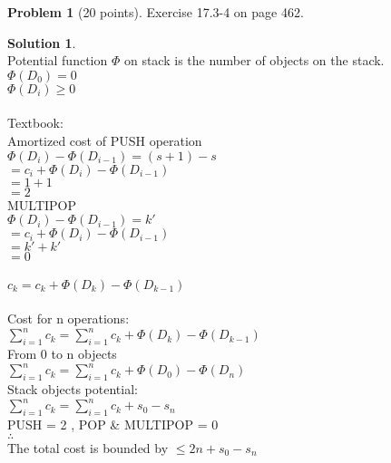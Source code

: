 \documentclass{article}
\theoremstyle{definition}
\newtheorem{problem}{Problem}
\newtheorem*{solution}{Solution}
\begin{document}
\newpage

\begin{problem}[20 points]
Exercise 17.3-4 on page 462.
\end{problem}
\begin{solution} \\
Potential function $\Phi$ on stack is the number of objects on the stack.\\
$\Phi(D_0) = 0$\\
$\Phi(D_i) \geq 0$\\
\\
Textbook:\\
Amortized cost of PUSH operation\\
$\Phi(D_i) - \Phi(D_{i-1}) = ( s + 1 ) - s$ \\
$=c_i + \Phi(D_i) - \Phi(D_{i-1}) $\\
$=1+1$\\
$=2$\\
MULTIPOP\\
$\Phi(D_i) - \Phi(D_{i-1}) = k'$\\
$=c_i + \Phi(D_i) - \Phi(D_{i-1}) $\\
$=k' + k'$\\
$=0$\\
\\
$c_k = c_k + \Phi(D_k) - \Phi(D_{k-1})$\\
\\
Cost for n operations:\\
$\sum_{i=1}^{n} c_k = \sum_{i=1}^{n} c_k + \Phi(D_k) - \Phi(D_{k-1})$\\
From 0 to n objects\\
$\sum_{i=1}^{n} c_k = \sum_{i=1}^{n} c_k + \Phi(D_0) - \Phi(D_{n})$\\
Stack objects potential:\\
$\sum_{i=1}^{n} c_k = \sum_{i=1}^{n} c_k + s_0 - s_n$
\\
PUSH = 2 , POP \& MULTIPOP = 0\\
$\therefore$\\
The total cost is bounded by $\leq 2n + s_0 - s_n$\\
\\



\end{solution}




\medskip



\goodbreak
\checklist
\end{document}
